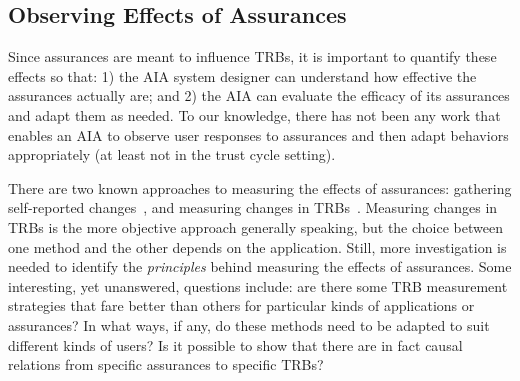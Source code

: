 \subsection{Observing Effects of Assurances} \label{sec:measuring_effects}
    Since assurances are meant to influence TRBs, it is important to quantify these effects so that:  1) the AIA system designer can understand how effective the assurances actually are; and 2) the AIA can evaluate the efficacy of its assurances and adapt them as needed.
    To our knowledge, there has not been any work that enables an AIA to observe user responses to assurances and then adapt behaviors appropriately (at least not in the trust cycle setting). 

    There are two known approaches to measuring the effects of assurances: gathering self-reported changes~\cite{Mcknight2011-gv,Muir1996-gt,Wickens1999-la,Salem2015-md,Kaniarasu2013-ho}, and measuring changes in TRBs~\cite{Freedy2007-sg,Desai2012-rc,Salem2015-md,Wu2016-ei,Bainbridge2011-pl}. Measuring changes in TRBs is the more objective approach generally speaking, but the choice between one method and the other depends on the application. Still, more investigation is needed to identify the \emph{principles} behind measuring the effects of assurances. Some interesting, yet unanswered, questions include: are there some TRB measurement strategies that fare better than others for particular kinds of applications or assurances? In what ways, if any, do these methods need to be adapted to suit different kinds of users? Is it possible to show that there are in fact causal relations from specific assurances to specific TRBs? 
